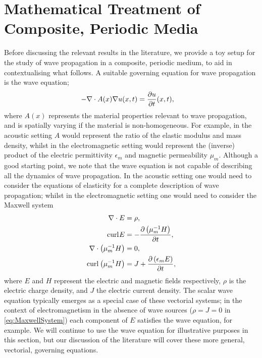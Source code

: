 \section{Mathematical Treatment of Composite, Periodic Media} \label{sec:MathHomLR}

Before discussing the relevant results in the literature, we provide a toy setup for the study of wave propagation in a composite, periodic medium, to aid in contextualising what follows.
A suitable governing equation for wave propagation is the wave equation;
\begin{align*}
	-\nabla\cdot A(x)\nabla u(x,t) &= \dfrac{\partial u}{\partial t}(x,t),
\end{align*}
where $A(x)$ represents the material properties relevant to wave propagation, and is spatially varying if the material is non-homogeneous.
For example, in the acoustic setting $A$ would represent the ratio of the elastic modulus and mass density, whilst in the electromagnetic setting would represent the (inverse) product of the electric permittivity $\epsilon_{m}$ and magnetic permeability $\mu_{m}$.
Although a good starting point, we note that the wave equation is not capable of describing all the dynamics of wave propagation.
In the acoustic setting one would need to consider the equations of elasticity for a complete description of wave propagation; whilst in the electromagnetic setting one would need to consider the Maxwell system
\begin{subequations} \label{eq:MaxwellSystem}
	\begin{align}
		\nabla\cdot E &= \rho, \\
		\mathrm{curl}_{}E &= -\dfrac{\partial \left( \mu_{m}^{-1}H \right)}{\partial t}, \\
		\nabla\cdot \left( \mu_{m}^{-1}H \right) &= 0, \\
		 \mathrm{curl}_{}\left( \mu_{m}^{-1}H \right) &= J + \dfrac{\partial \left( \epsilon_{m}E \right)}{\partial t},
	\end{align}
\end{subequations}
where $E$ and $H$ represent the electric and magnetic fields respectively, $\rho$ is the electric charge density, and $J$ the electric current density. 
The scalar wave equation typically emerges as a special case of these vectorial systems; in the context of electromagnetism in the absence of wave sources ($\rho=J=0$ in \eqref{eq:MaxwellSystem}) each component of $E$ satisfies the wave equation, for example.
We will continue to use the wave equation for illustrative purposes in this section, but our discussion of the literature will cover these more general, vectorial, governing equations.

